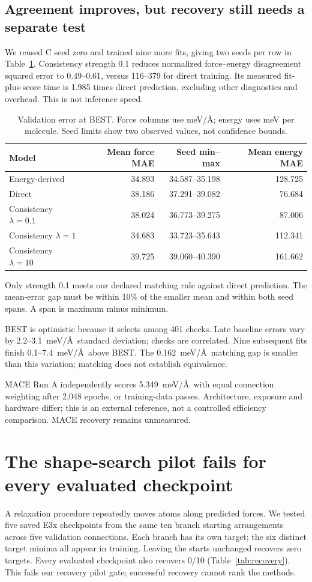 \documentclass{article}
\begin{document}
\subsection{Agreement improves, but recovery still needs a separate test}
We reused C seed zero and trained nine more fits, giving two seeds per row in Table~\ref{tab:prediction}. Consistency strength 0.1 reduces normalized force--energy disagreement squared error to 0.49--0.61, versus 116--379 for direct training. Its measured fit-plus-score time is 1.985 times direct prediction, excluding other diagnostics and overhead. This is not inference speed.
\begin{table}[H]
\centering\small
\caption{Validation error at BEST. Force columns use meV/\AA; energy uses meV per molecule. Seed limits show two observed values, not confidence bounds.}\label{tab:prediction}
\begin{tabular}{lrrr}\toprule
Model & Mean force MAE & Seed min--max & Mean energy MAE\\\midrule
Energy-derived & 34.893 & 34.587--35.198 & 128.725\\
Direct & 38.186 & 37.291--39.082 & 76.684\\
Consistency $\lambda=0.1$ & 38.024 & 36.773--39.275 & 87.006\\
Consistency $\lambda=1$ & 34.683 & 33.723--35.643 & 112.341\\
Consistency $\lambda=10$ & 39.725 & 39.060--40.390 & 161.662\\\bottomrule
\end{tabular}
\end{table}
Only strength 0.1 meets our declared matching rule against direct prediction. The mean-error gap must be within 10\% of the smaller mean and within both seed spans. A span is maximum minus minimum.

BEST is optimistic because it selects among 401 checks. Late baseline errors vary by 2.2--3.1~meV/\AA\ standard deviation; checks are correlated. Nine subsequent fits finish 0.1--7.4~meV/\AA\ above BEST. The 0.162~meV/\AA\ matching gap is smaller than this variation; matching does not establish equivalence.

MACE Run A independently scores 5.349~meV/\AA\ with equal connection weighting after 2,048 epochs, or training-data passes. Architecture, exposure and hardware differ; this is an external reference, not a controlled efficiency comparison. MACE recovery remains unmeasured.

\section{The shape-search pilot fails for every evaluated checkpoint}
A relaxation procedure repeatedly moves atoms along predicted forces. We tested five saved E3x checkpoints from the same ten branch starting arrangements across five validation connections. Each branch has its own target; the six distinct target minima all appear in training. Leaving the starts unchanged recovers zero targets. Every evaluated checkpoint also recovers 0/10 (Table~\ref{tab:recovery}). This fails our recovery pilot gate; successful recovery cannot rank the methods.
\end{document}
